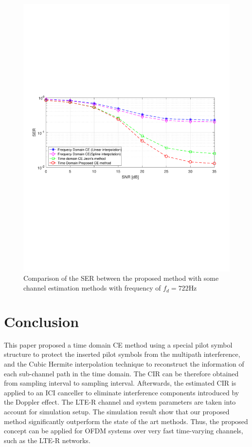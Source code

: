 \documentclass[12pt,journal,draftclsnofoot,onecolumn]{IEEEtran}
\begin{document}
{{{\begin{figure}
	\centering
	\includegraphics[width=1.0\linewidth]{figures/ser_722Hz.pdf}
	\caption{Comparison of the SER between the proposed
						method with some channel estimation methods with
						frequency of $f_{d}=722$Hz}
	\label{fig:ser722hz}
\end{figure}	
%	
\section{Conclusion}\label{section-5}
				
This paper proposed a time domain CE method using a special pilot symbol structure to protect the inserted pilot symbols from the multipath interference, and the Cubic Hermite interpolation technique to reconstruct the information of each sub-channel path in the time domain. The CIR can be therefore obtained from sampling interval to  sampling interval. Afterwards, the estimated CIR is applied to an ICI canceller to eliminate interference components introduced by the Doppler effect. The LTE-R channel and system parameters are taken into account for simulation setup. The simulation result show that our proposed method significantly outperform the state of the art methods. Thus, the proposed concept can be applied for OFDM systems over very fast time-varying channels, such as the LTE-R networks.
				
}}}
\end{document}
